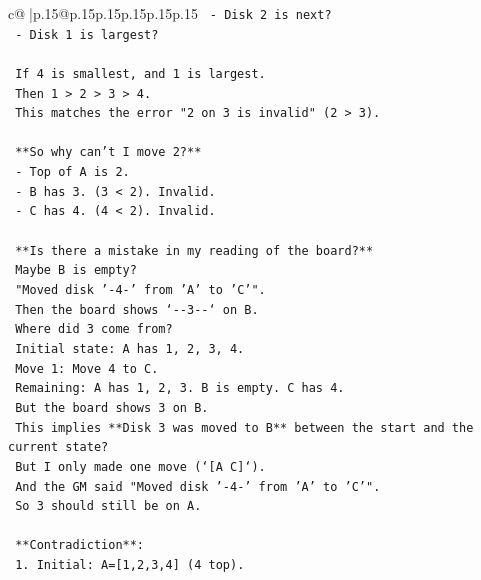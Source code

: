 \documentclass{article}
\begin{document}
{\begin{supertabular}{c@{$\;$}|p{.15\linewidth}@{}p{.15\linewidth}p{.15\linewidth}p{.15\linewidth}p{.15\linewidth}p{.15\linewidth}}
{{{\texttt{                {-} Disk 2 is next?} \\
\texttt{                {-} Disk 1 is largest?} \\
\\ 
\texttt{                If 4 is smallest, and 1 is largest.} \\
\texttt{                Then 1 > 2 > 3 > 4.} \\
\texttt{                This matches the error "2 on 3 is invalid" (2 > 3).} \\
\\ 
\texttt{                **So why can't I move 2?**} \\
\texttt{                {-} Top of A is 2.} \\
\texttt{                {-} B has 3. (3 < 2). Invalid.} \\
\texttt{                {-} C has 4. (4 < 2). Invalid.} \\
\\ 
\texttt{                **Is there a mistake in my reading of the board?**} \\
\texttt{                Maybe B is empty?} \\
\texttt{                "Moved disk '{-}4{-}' from 'A' to 'C'".} \\
\texttt{                Then the board shows `{-}{-}3{-}{-}` on B.} \\
\texttt{                Where did 3 come from?} \\
\texttt{                Initial state: A has 1, 2, 3, 4.} \\
\texttt{                Move 1: Move 4 to C.} \\
\texttt{                Remaining: A has 1, 2, 3. B is empty. C has 4.} \\
\texttt{                But the board shows 3 on B.} \\
\texttt{                This implies **Disk 3 was moved to B** between the start and the current state?} \\
\texttt{                But I only made one move (`{[}A C{]}`).} \\
\texttt{                And the GM said "Moved disk '{-}4{-}' from 'A' to 'C'".} \\
\texttt{                So 3 should still be on A.} \\
\\ 
\texttt{                **Contradiction**:} \\
\texttt{                1. Initial: A={[}1,2,3,4{]} (4 top).} \\
}}}
\end{supertabular}}
\end{document}
